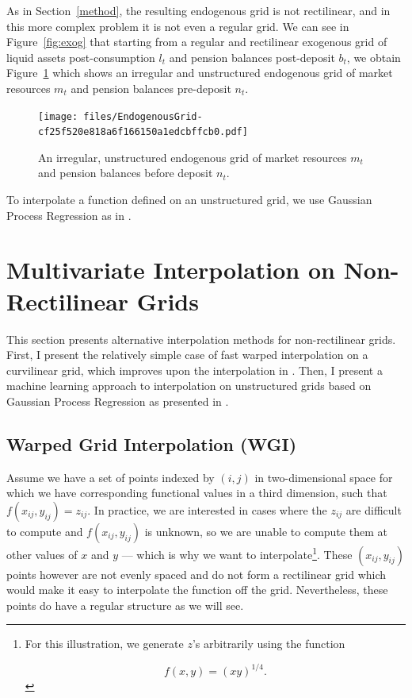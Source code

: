 \documentclass{article}
\newcommand{\bRat}{b}
\newcommand{\mRat}{m}
\newcommand{\nRat}{n}
\newcommand{\lRat}{l}
\begin{document}
As in Section~\ref{method}, the resulting endogenous grid is not rectilinear, and in this more complex problem it is not even a regular grid. We can see in  Figure~\ref{fig:exog} that starting from a regular and rectilinear exogenous grid of liquid assets post-consumption $\lRat_{t}$ and pension balances post-deposit $\bRat_{t}$, we obtain Figure~\ref{fig:endog} which shows an irregular and unstructured endogenous grid of market resources $\mRat_{t}$ and pension balances pre-deposit $\nRat_{t}$.

\begin{figure}[!htbp]
\centering
\texttt{[image: files/EndogenousGrid-cf25f520e818a6f166150a1edcbffcb0.pdf]}
\caption{An irregular, unstructured endogenous grid of market resources $\mRat_{t}$ and pension balances before deposit $\nRat_{t}$.}
\label{fig:endog}
\end{figure}

To interpolate a function defined on an unstructured grid, we use Gaussian Process Regression as in \citet{Scheidegger2019}.

\section{Multivariate Interpolation on Non-Rectilinear Grids}\label{multinterp}

This section presents alternative interpolation methods for non-rectilinear grids. First, I present the relatively simple case of fast warped interpolation on a curvilinear grid, which improves upon the interpolation in \citet{White2015}. Then, I present a machine learning approach to interpolation on unstructured grids based on Gaussian Process Regression as presented in \citet{Scheidegger2019}.

\subsection{Warped Grid Interpolation (WGI)}\label{Warped Grid Interpolation (WGI)}

Assume we have a set of points indexed by $(i,j)$ in two-dimensional space for which we have corresponding functional values in a third dimension, such that $f(x_{ij},y_{ij}) = z_{ij}$. In practice, we are interested in cases where the $z_{ij}$ are difficult to compute and $f(x_{ij},y_{ij})$ is unknown, so we are unable to compute them at other values of $x$ and $y$ --- which is why we want to interpolate\footnote{For this illustration, we generate $z$'s arbitrarily using the function

\begin{equation}
f(x,y) = (xy)^{1/4}.
\end{equation}}. These $(x_{ij},y_{ij})$ points however are not evenly spaced and do not form a rectilinear grid which would make it easy to interpolate the function off the grid. Nevertheless, these points do have a regular structure as we will see.
\end{document}
